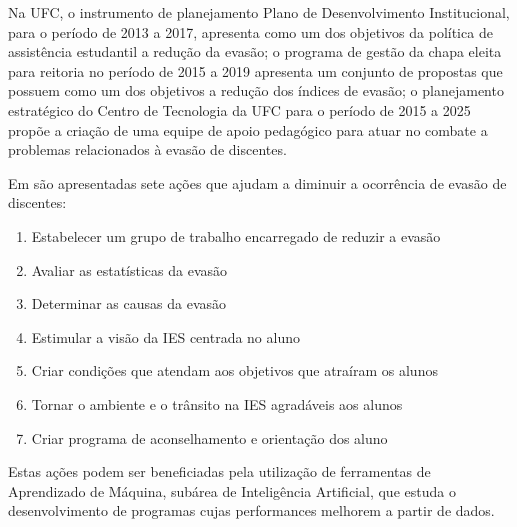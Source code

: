 Na UFC, o instrumento de planejamento Plano de Desenvolvimento Institucional\cite{pdi_ufc}, para o período de 2013 a 2017, apresenta como um dos objetivos da política de assistência estudantil a redução da evasão; o programa de gestão da chapa eleita para reitoria no período de 2015 a 2019\cite{henry} apresenta um conjunto de propostas que possuem como um dos objetivos a redução dos índices de evasão; o planejamento estratégico do Centro de Tecnologia da UFC para o período de 2015 a 2025 propõe a criação de uma equipe de apoio pedagógico para atuar no combate a problemas relacionados à evasão de discentes.



Em \cite{evasao_panorama2} são apresentadas sete ações que ajudam a diminuir a ocorrência de evasão de discentes:

\begin{enumerate}

\item Estabelecer um grupo de trabalho encarregado de reduzir a evasão
\item Avaliar as estatísticas da evasão
\item Determinar as causas da evasão
\item Estimular a visão da IES centrada no aluno
\item Criar condições que atendam aos objetivos que atraíram os alunos
\item Tornar o ambiente e o trânsito na IES agradáveis aos alunos
\item Criar programa de aconselhamento e orientação dos aluno

\end{enumerate}

Estas ações podem ser beneficiadas pela utilização de ferramentas de Aprendizado de Máquina, subárea de Inteligência Artificial, que estuda o desenvolvimento de programas cujas performances melhorem a partir de dados. 


